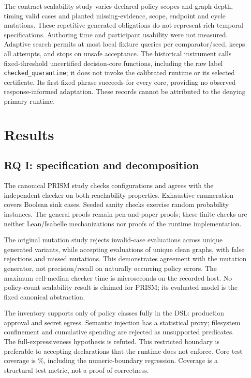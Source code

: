 \documentclass[lettersize,journal]{IEEEtran}
\begin{document}
The contract scalability study varies declared policy scopes and graph depth,
timing valid cases and planted missing-evidence, scope, endpoint and cycle
mutations. These repetitive generated obligations do not represent rich
temporal specifications. Authoring time and participant usability were not
measured. Adaptive search permits at most \resAdaptiveBudget{} local fixture
queries per comparator/seed, keeps all attempts, and stops on unsafe
acceptance. The historical instrument calls fixed-threshold uncertified
decision-core functions, including the raw label \texttt{checked\_quarantine};
it does not invoke the calibrated runtime or its selected certificate. Its
first fixed phrase succeeds for every core, providing no observed
response-informed adaptation. These records cannot be attributed to the
denying primary runtime.

\section{Results}
\label{sec:results}
\subsection{RQ I: specification and decomposition}
The canonical PRISM study checks \resPrismCases{} configurations and agrees
with the independent checker on both reachability properties. Exhaustive
enumeration covers \resFormalStates{} Boolean sink cases. Seeded sanity
checks exercise \resFormalInstances{} random probability instances. The
general proofs remain pen-and-paper proofs; these finite checks are neither
Lean/Isabelle mechanizations nor proofs of the runtime implementation.

The original mutation study rejects \resPrimaryCheckerTP{} invalid-case
evaluations across \resPrimaryCheckerUniqueInvalid{} unique generated variants,
while accepting \resPrimaryCheckerTN{} evaluations of
\resPrimaryCheckerUniqueClean{} unique clean graphs, with
\resPrimaryCheckerFP{} false rejections and \resPrimaryCheckerFN{} missed
mutations. This demonstrates agreement with the mutation generator, not
precision/recall on naturally occurring policy errors. The maximum cell-median
checker time is \resPrimaryCheckerMax{} microseconds on the recorded host.
No policy-count scalability result is claimed for PRISM; its evaluated model
is the fixed canonical abstraction.

The inventory supports only \resSupportedClasses{} of
\resPolicyClasses{} policy classes fully in the DSL: production approval and
secret egress. Semantic injection has a statistical proxy; filesystem
confinement and cumulative spending are rejected as unsupported predicates.
The full-expressiveness hypothesis is refuted. This restricted boundary is
preferable to accepting declarations that the runtime does not enforce.
Core test coverage is \resCoreCoverage{}\%, including the numeric-boundary
regression. Coverage is a structural test metric, not a proof of correctness.
\end{document}
